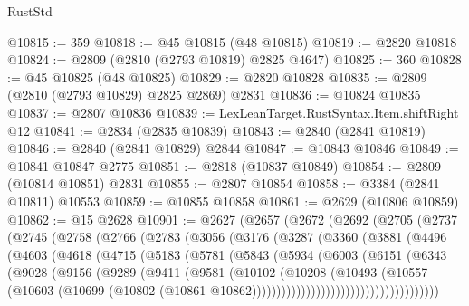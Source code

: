 \begin{lexlean}{RustStd}
\begin{coremodule}
@10815 := 359
@10818 := @45 @10815 (@48 @10815)
@10819 := @2820 @10818
@10824 := @2809 (@2810 (@2793 @10819) @2825 @4647)
@10825 := 360
@10828 := @45 @10825 (@48 @10825)
@10829 := @2820 @10828
@10835 := @2809 (@2810 (@2793 @10829) @2825 @2869) @2831
@10836 := @10824 @10835
@10837 := @2807 @10836
@10839 := LexLeanTarget.RustSyntax.Item.shiftRight @12
@10841 := @2834 (@2835 @10839)
@10843 := @2840 (@2841 @10819)
@10846 := @2840 (@2841 @10829) @2844
@10847 := @10843 @10846
@10849 := @10841 @10847 @2775
@10851 := @2818 (@10837 @10849)
@10854 := @2809 (@10814 @10851) @2831
@10855 := @2807 @10854
@10858 := @3384 (@2841 @10811) @10553
@10859 := @10855 @10858
@10861 := @2629 (@10806 @10859)
@10862 := @15 @2628
@10901 := @2627
    (@2657
      (@2672
        (@2692
          (@2705
            (@2737
              (@2745
                (@2758
                  (@2766
                    (@2783
                      (@3056
                        (@3176
                          (@3287
                            (@3360
                              (@3881
                                (@4496
                                  (@4603
                                    (@4618
                                      (@4715
                                        (@5183
                                          (@5781
                                            (@5843
                                              (@5934
                                                (@6003
                                                  (@6151
                                                    (@6343
                                                      (@9028
                                                        (@9156
                                                          (@9289
                                                            (@9411
                                                              (@9581
                                                                (@10102
                                                                  (@10208
                                                                    (@10493
                                                                      (@10557
                                                                        (@10603
                                                                          (@10699
                                                                            (@10802
                                                                              (@10861
                                                                                @10862))))))))))))))))))))))))))))))))))))))

\end{coremodule}
\end{lexlean}
